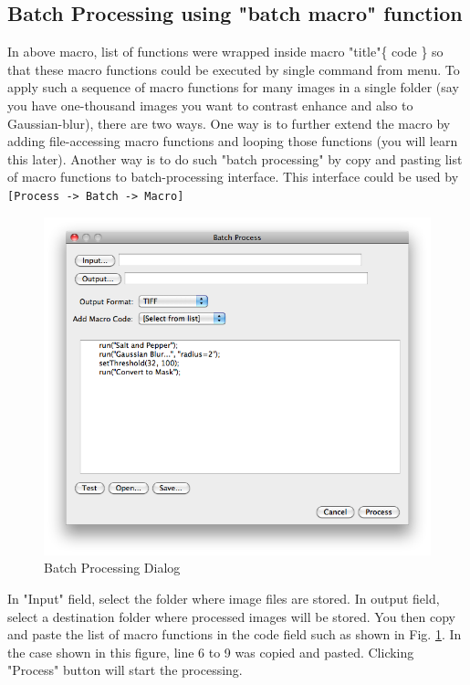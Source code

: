 \documentclass[11pt,a4paper,oneside]{report}
\newcommand{\ijmenu}[1]{\texttt{\small#1}}
\begin{document}



\subsection{Batch Processing using "batch macro" function}
In above macro, list of functions were wrapped inside macro "title"\{ code \} 
so that these macro functions could be executed by single command from menu. 
To apply such a sequence of macro functions for many images in a single folder 
(say you have one-thousand images you want to contrast enhance and also to Gaussian-blur), 
there are two ways. One way is to further extend the macro by adding file-accessing macro functions and 
looping those functions (you will learn this later). 
Another way is to do such "batch processing" by copy and pasting list of
macro functions to batch-processing interface. 
This interface could be used by \ijmenu{[Process -> Batch -> Macro]}

\begin{figure}[htbp]
\begin{center}
\includegraphics[scale=0.4]{fig/BatchProcessing.png}
\caption{Batch Processing Dialog} \label{fig_BatchProcessInterface}
\end{center}
\end{figure}

In "Input" field, select the folder where image files are stored. 
In output field, select a destination folder where processed images will be stored. 
You then copy and paste the list of macro functions in the code field such as 
shown in Fig. \ref{fig_BatchProcessInterface}. 
In the case shown in this figure, line 6 to 9 was copied and pasted. 
Clicking "Process" button will start the processing.
\newpage
\end{document}
